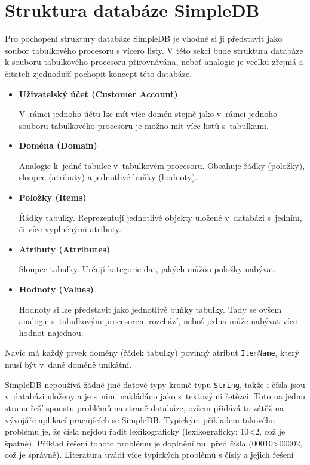 \documentclass[oneside,12pt]{fithesis2}
\begin{document}
\section{Struktura databáze SimpleDB}\label{simpleDBArchitecture}
Pro pochopení struktury databáze SimpleDB je vhodné si ji představit jako soubor tabulkového procesoru s vícero listy\cite[kapitola Amazon SimpleDB Concepts]{simpledbDeveloper}. V této sekci bude struktura databáze k souboru tabulkového procesoru přirovnávána, neboť analogie je vcelku zřejmá a čitateli zjednoduší pochopit koncept této databáze.
\begin{itemize}
 \item \textbf{Uživatelský účet (Customer Account)}
 
 V~rámci jednoho účtu lze mít více domén stejně jako v~rámci jednoho souboru tabulkového procesoru je možno mít více listů s~tabulkami.
 \item \textbf{Doména (Domain)}
 
 Analogie k~jedné tabulce v~tabulkovém procesoru. Obsahuje řádky (položky), sloupce (atributy) a jednotlivé buňky (hodnoty).
 \item \textbf{Položky (Items)}
 
 Řádky tabulky. Reprezentují jednotlivé objekty uložené v~databázi s~jedním, či více vyplněnými atributy.
 \item \textbf{Atributy (Attributes)}
 
 Sloupce tabulky. Určují kategorie dat, jakých můžou položky nabývat.
 
 \item \textbf{Hodnoty (Values)}
 
 Hodnoty si lze představit jako jednotlivé buňky tabulky. Tady se ovšem analogie s~tabulkovým procesorem rozchází, neboť jedna  může nabývat více hodnot najednou.
 
\end{itemize}
Navíc má každý prvek domény (řádek tabulky) povinný atribut \verb<ItemName<, který musí být v~dané doméně unikátní.

SimpleDB nepoužívá žádné jiné datové typy kromě typu \verb<String<, takže i čísla jsou v~databázi uloženy a je s~nimi nakládáno jako s~textovými řetězci. Toto na jednu stranu řeší spoustu problémů na straně databáze, ovšem přidává to zátěž na vývojáře aplikací pracujících se SimpleDB. Typickým příkladem takového problému je, že čísla nejdou řadit lexikograficky (lexikograficky: 10<2, což je špatně). Příklad řešení tohoto problému je doplnění nul před čísla (00010>00002, což je správně). Literatura uvádí více typických problémů s čísly a jejich řešení \cite[strana 46, Working with Numerical Data]{simpledbDeveloper}
\end{document}
